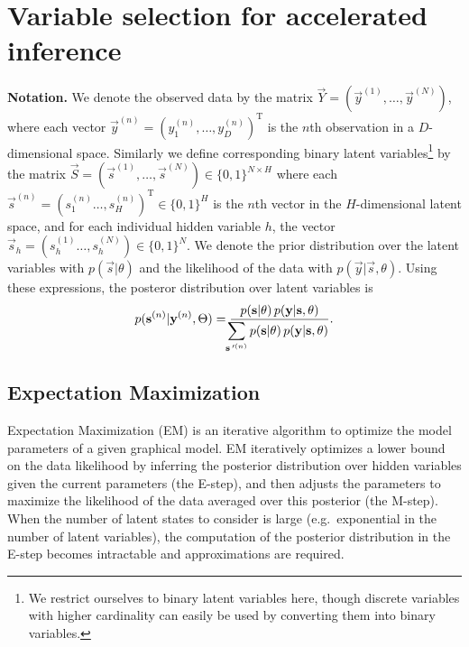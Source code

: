 \section{Variable selection for accelerated inference}
\label{method}
%
\textbf{Notation.}
We denote the observed data by the matrix $\vec{Y}=(\vec{y}^{(1)}, \dots, \vec{y}^{(N)})$, where each vector $\vec{y}^{(n)} = ( y_1^{(n)}, \dots, y_D^{(n)})^\mathrm{T}$ is the $n$th observation 
in a $D$-dimensional space.
Similarly we define corresponding 
binary latent variables\footnote{We restrict ourselves to binary latent variables here, though
discrete variables with higher cardinality can easily be used by
converting them into binary variables.} 
by the matrix $\vec{S} = (\vec{s}^{(1)}, \dots, \vec{s}^{(N)})\in \{0,1\}^{N \times H}$ 
where each $\vec{s}^{(n)}=(s_1^{(n)}\dots, s^{(n)}_H)^\mathrm{T} \in \{0,1\}^{H}$ is the $n$th vector in the $H$-dimensional latent space,
and for each individual hidden variable $h$, the vector $\vec{s}_h=(s_h^{(1)}\dots, s^{(N)}_h)\in \{0,1\}^{N}$. 
%
We denote the prior distribution over the latent variables with $p(\vec{s} | \theta)$ 
and the likelihood of the data with $p(\vec{y} | \vec{s}, \theta)$.
Using these expressions, the posteror distribution over latent variables is 
%
\vspace{-.1cm}
\begin{equation}
\label{eq:post}
p({\mathbf{s}}^{(n)}|{\mathbf{y}}^{(n)},\Theta)  = \frac{p({\mathbf{s}} | \theta) \, p({\mathbf{y}} | {\mathbf{s}}, \theta)}
{\displaystyle\hspace{-1.5mm}\sum_{{\mathbf{s}}\,'^{(n)}} p({\mathbf{s}} | \theta) \, p({\mathbf{y}} | {\mathbf{s}}, \theta)}.
\end{equation}
\vspace{-.3cm}

\subsection{Expectation Maximization}
Expectation Maximization (EM) is an iterative algorithm to optimize the model parameters of a given graphical model.
EM iteratively optimizes a lower bound on the data likelihood by inferring the
posterior distribution over hidden variables given the current parameters (the
E-step), and then adjusts the parameters to maximize the likelihood of the
data averaged over this posterior (the M-step).
%
When the number of latent states to consider is large (e.g.\ exponential in the
number of latent variables), the computation of the posterior distribution in
the E-step becomes intractable and approximations are required.

